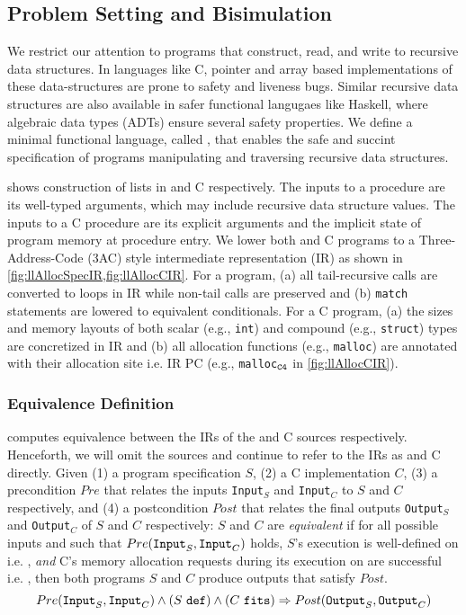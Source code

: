 \subsection{Problem Setting and Bisimulation}
\label{sec:syn-setting-bisimulation}
We restrict our attention to programs that construct, read, and write
to recursive data structures. In languages like C, pointer and array based
implementations of these data-structures are prone to safety and liveness bugs.
Similar recursive data structures are also available in safer functional langugaes like Haskell,
where algebraic data types (ADTs) \cite{hope} ensure several safety properties.
We define a minimal functional language, called \SpecL{}, that enables the safe
and succint specification of programs manipulating and traversing recursive data structures.



 shows construction of lists in \SpecL{} and C respectively.
The inputs to a \SpecL{} procedure are its well-typed arguments, which may include recursive data structure
values. The inputs to a C procedure are its explicit arguments and the implicit state of program memory
at procedure entry. We lower both \SpecL{} and C programs to a
Three-Address-Code (3AC) style intermediate representation (IR)
as shown in \cref{fig:llAllocSpecIR,fig:llAllocCIR}. For a \SpecL{} program,
(a) all tail-recursive calls are converted to loops in IR while non-tail calls are preserved and
(b) {\tt match} statements are lowered to equivalent \sumDtor{} conditionals.
For a C program, (a) the sizes and memory layouts of both scalar (e.g., {\tt int})
and compound (e.g., {\tt struct}) types are concretized in IR and
(b) all allocation functions (e.g., {\tt malloc}) are annotated with their
allocation site i.e. IR PC (e.g., {\tt malloc$_{\tt C4}$} in \cref{fig:llAllocCIR}).

\subsubsection{Equivalence Definition}
\label{sec:syn-equivalence}
\toolName{} computes equivalence between the IRs of the \SpecL{} and C sources respectively.
Henceforth, we will omit the sources and continue to refer to the IRs as \SpecL{} and C directly.
Given (1) a \SpecL{} program specification $S$, (2) a C implementation $C$,
(3) a precondition $Pre$ that relates the inputs {\tt Input}$_S$ and {\tt Input}$_C$ to $S$ and $C$
respectively, and (4) a postcondition $Post$ that relates the final outputs {\tt Output}$_S$
and {\tt Output}$_C$ of $S$ and $C$ respectively:
$S$ and $C$ are {\em equivalent} if for all possible inputs  and  such that
$Pre({\tt Input}_{S},{\tt Input}_{C})$ holds,
$S$'s execution is well-defined on  i.e. \sdef{}, {\em and} C's
memory allocation requests during its execution on  are successful i.e. \cfits{},
then both programs $S$ and $C$ produce outputs
that satisfy $Post$.
$$
Pre({\tt Input}_{S},{\tt Input}_{C}) \land {(S\ {\tt def})}{} \land {(C\ {\tt fits})}{} \Rightarrow Post({\tt Output}_{S},{\tt Output}_{C})
$$

